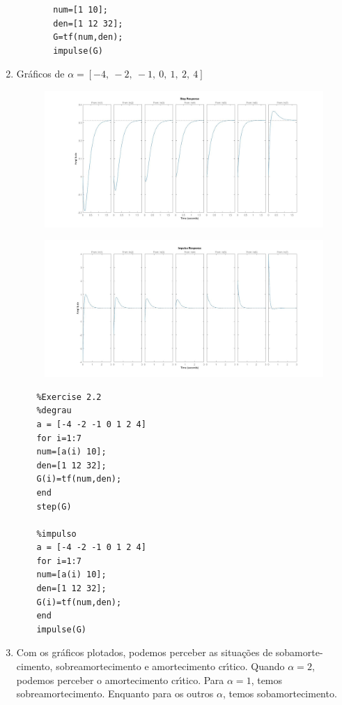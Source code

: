 \documentclass[a4paper,11pt]{article}
\begin{document}
\begin{enumerate}
\begin{itemize}
\begin{lstlisting}
	num=[1 10];
	den=[1 12 32];
	G=tf(num,den);
	impulse(G)
	\end{lstlisting}
	\end{itemize}
	\clearpage
	\item Gr\'{a}ficos de $\alpha=[-4, \ -2, \ -1, \ 0, \ 1, \ 2, \ 4]$
	\begin{figure}[!h]
		\includegraphics[scale=0.3]{Figures/e22step}
	\end{figure}
	\begin{figure}[!h]
		\includegraphics[scale=0.3]{Figures/e22impulse}
	\end{figure}
	\newpage
	\begin{lstlisting}
	%Exercise 2.2
	%degrau
	a = [-4 -2 -1 0 1 2 4]
	for i=1:7
	num=[a(i) 10];
	den=[1 12 32];
	G(i)=tf(num,den);
	end
	step(G)
	
	%impulso
	a = [-4 -2 -1 0 1 2 4]
	for i=1:7
	num=[a(i) 10];
	den=[1 12 32];
	G(i)=tf(num,den);
	end
	impulse(G)
	\end{lstlisting}
	\item Com os gr\'{a}ficos plotados, podemos perceber as situa\c{c}\~{o}es de sobamorte-cimento, sobreamortecimento e amortecimento cr\'{\i}tico. Quando $\alpha=2$, podemos perceber o amortecimento cr\'{\i}tico. Para $\alpha=1$, temos sobreamortecimento. Enquanto para os outros $\alpha$, temos sobamortecimento.
\end{enumerate}
\vskip0.5cm
\end{document}
